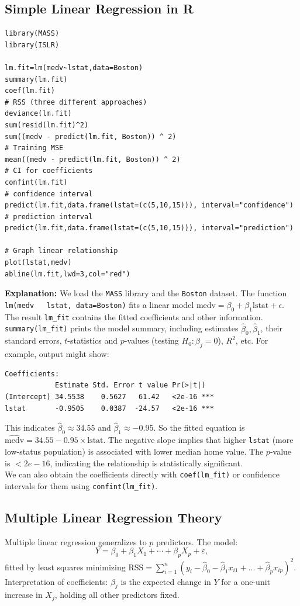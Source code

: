 \documentclass[11pt]{article}
\begin{document}
\subsection{Simple Linear Regression in R}
\begin{lstlisting}
library(MASS)
library(ISLR)

lm.fit=lm(medv~lstat,data=Boston)
summary(lm.fit)
coef(lm.fit)
# RSS (three different approaches)
deviance(lm.fit)
sum(resid(lm.fit)^2)
sum((medv - predict(lm.fit, Boston)) ^ 2) 
# Training MSE
mean((medv - predict(lm.fit, Boston)) ^ 2)
# CI for coefficients
confint(lm.fit)
# confidence interval
predict(lm.fit,data.frame(lstat=(c(5,10,15))), interval="confidence")
# prediction interval
predict(lm.fit,data.frame(lstat=(c(5,10,15))), interval="prediction")

# Graph linear relationship
plot(lstat,medv)
abline(lm.fit,lwd=3,col="red")
\end{lstlisting}

\noindent \textbf{Explanation:} We load the \texttt{MASS} library and the \texttt{Boston} dataset. The function \texttt{lm(medv ~ lstat, data=Boston)} fits a linear model $\text{medv} = \beta_0 + \beta_1 \text{lstat} + \epsilon$. The result \texttt{lm\_fit} contains the fitted coefficients and other information. \texttt{summary(lm\_fit)} prints the model summary, including estimates $\hat\beta_0, \hat\beta_1$, their standard errors, $t$-statistics and $p$-values (testing $H_0: \beta_j=0$), $R^2$, etc. For example, output might show:

\begin{verbatim}
Coefficients:
            Estimate Std. Error t value Pr(>|t|)    
(Intercept) 34.5538    0.5627   61.42   <2e-16 ***
lstat       -0.9505    0.0387  -24.57   <2e-16 ***
\end{verbatim}

\noindent This indicates $\hat\beta_0 \approx 34.55$ and $\hat\beta_1 \approx -0.95$. So the fitted equation is $\widehat{\text{medv}} = 34.55 - 0.95 \times \text{lstat}$. The negative slope implies that higher \texttt{lstat} (more low-status population) is associated with lower median home value. The $p$-value is $<2e-16$, indicating the relationship is statistically significant. \\

\noindent We can also obtain the coefficients directly with \texttt{coef(lm\_fit)} or confidence intervals for them using \texttt{confint(lm\_fit)}.

\subsection{Multiple Linear Regression Theory}
Multiple linear regression generalizes to $p$ predictors. The model:
\[ Y = \beta_0 + \beta_1 X_1 + \cdots + \beta_p X_p + \varepsilon, \]
fitted by least squares minimizing $\text{RSS} = \sum_{i=1}^n (y_i - \hat\beta_0 - \hat{\beta}_1x_{i1} + ... + \hat\beta_px_{ip})^2$. Interpretation of coefficients: $\beta_j$ is the expected change in $Y$ for a one-unit increase in $X_j$, holding all other predictors fixed. \\
\end{document}

